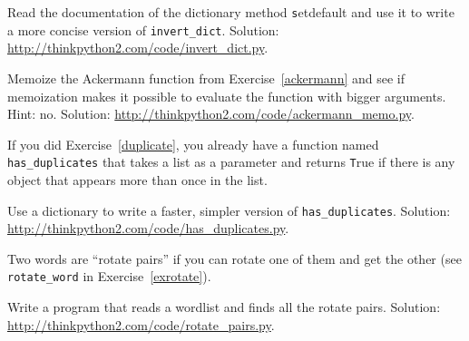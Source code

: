 \documentclass[
DIV=11,
fontsize=13,
twoside,
headinclude=false,
titlepage=firstiscover,
abstract=true,
headsepline=true,
footsepline=true,
chapterprefix=true, %
headings=big,
bibliography=totoc,%
captions=tableheading
]{scrbook}
\theoremstyle{definition}
\begin{document}
\begin{exercise}
\normalfont
\label{setdefault}

Read the documentation of the dictionary method {\texttt setdefault}
and use it to write a more concise version of \verb"invert_dict".
Solution: \url{http://thinkpython2.com/code/invert_dict.py}.

\end{exercise}


\begin{exercise}
\normalfont
Memoize the Ackermann function from Exercise~\ref{ackermann} and see if
memoization makes it possible to evaluate the function with bigger
arguments.  Hint: no.
Solution: \url{http://thinkpython2.com/code/ackermann_memo.py}.

\end{exercise}



\begin{exercise}
\normalfont
{}

If you did Exercise~\ref{duplicate}, you already have
a function named \verb"has_duplicates" that takes a list
as a parameter and returns {\texttt True} if there is any object
that appears more than once in the list.

Use a dictionary to write a faster, simpler version of
\verb"has_duplicates". 
Solution: \url{http://thinkpython2.com/code/has_duplicates.py}.

\end{exercise}


\begin{exercise}
\normalfont
\label{exrotatepairs}

Two words are ``rotate pairs'' if you can rotate one of them
and get the other (see \verb"rotate_word" in Exercise~\ref{exrotate}).

Write a program that reads a wordlist and finds all the rotate
pairs.  Solution: \url{http://thinkpython2.com/code/rotate_pairs.py}.

\end{exercise}
\end{document}
